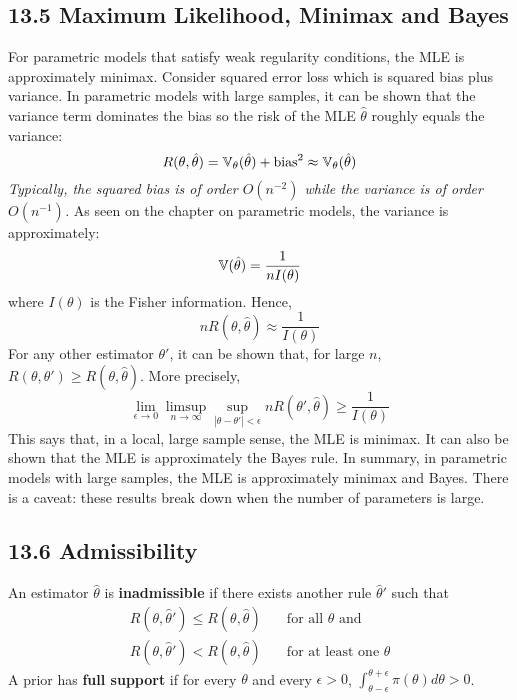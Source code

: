 \subsection*{13.5 Maximum Likelihood, Minimax and
Bayes}\label{maximum-likelihood-minimax-and-bayes}
For parametric models that satisfy weak regularity conditions, the MLE
is approximately minimax. Consider squared error loss which is squared
bias plus variance. In parametric models with large samples, it can be
shown that the variance term dominates the bias so the risk of the MLE
\(\hat{\theta}\) roughly equals the variance:
\[
R(\theta, \hat{\theta}) = \operatorname{\mathbb{V}}_\theta(\hat{\theta}) + \text{bias}^{2} \approx \operatorname{\mathbb{V}}_\theta(\hat{\theta})
\]
\emph{Typically, the squared bias is of order \(O(n^{-2})\) while the
variance is of order \(O(n^{-1})\).}
As seen on the chapter on parametric models, the variance is
approximately:
\[
\operatorname{\mathbb{V}}(\hat{\theta}) = \frac{1}{nI(\theta)}
\]
where \(I(\theta)\) is the Fisher information. Hence,
\[
n R(\theta, \hat{\theta}) \approx \frac{1}{I(\theta)}
\]
For any other estimator \(\theta'\), it can be shown that, for large
\(n\), \(R(\theta, \theta') \geq R(\theta, \hat{\theta})\). More
precisely,
\[
\lim_{\epsilon \rightarrow 0} \limsup_{n \rightarrow \infty} \sup_{|\theta - \theta'| < \epsilon} n R(\theta', \hat{\theta}) \geq \frac{1}{I(\theta)}
\]
This says that, in a local, large sample sense, the MLE is minimax. It
can also be shown that the MLE is approximately the Bayes rule.
In summary, in parametric models with large samples, the MLE is
approximately minimax and Bayes. There is a caveat: these results break
down when the number of parameters is large.

\subsection*{13.6 Admissibility}\label{admissibility}
An estimator \(\hat{\theta}\) is \textbf{inadmissible} if there exists
another rule \(\hat{\theta}'\) such that
\begin{align*}
R(\theta, \hat{\theta}') \leq R(\theta, \hat{\theta}) & \quad \text{for all } \theta \text{ and} \\
R(\theta, \hat{\theta}') < R(\theta, \hat{\theta}) & \quad \text{for at least one } \theta
\end{align*}
A prior has \textbf{full support} if for every \(\theta\) and every
\(\epsilon > 0\),
\(\int_{\theta - \epsilon}^{\theta + \epsilon} \pi(\theta) d\theta > 0\).

